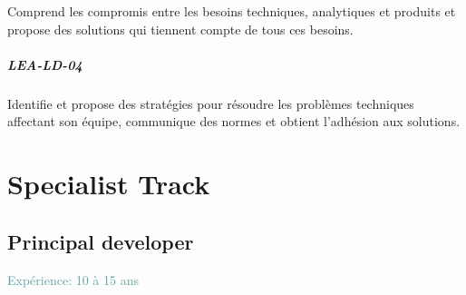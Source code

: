 \documentclass[a4paper, french, openany, 12pt]{book}
\newcommand\cha[1]{\textcolor{OliveGreen}{\textbf{\uppercase{lea-{#1}}}}}
\newcommand\xp[1]{\textcolor{CadetBlue}{Expérience: {#1} ans}}
\begin{document}
\begin{multicols}{2}
  Comprend les compromis entre les besoins techniques, analytiques et produits et propose des solutions qui tiennent 
  compte de tous ces besoins.

  \subsubsection*{\cha{ld-04}}

  Identifie et propose des stratégies pour résoudre les problèmes techniques affectant son équipe, communique des normes 
  et obtient l'adhésion aux solutions.

\end{multicols}

\part{Specialist Track}

\chapter{Principal developer}

\xp{10 à 15}
\end{document}
